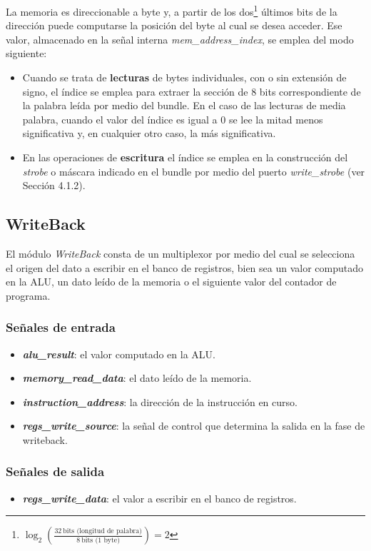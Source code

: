 La memoria es direccionable a byte y, a partir de los dos\footnote{$\log_2\left(\frac{32\ \text{bits (longitud de palabra)}}{8\ \text{bits (1 byte)}}\right) = 2$} últimos bits de la dirección puede computarse la posición del byte al cual se desea acceder. Ese valor, almacenado en la señal interna \textit{mem\_address\_index}, se emplea del modo siguiente:

\begin{itemize}
  \item Cuando se trata de \textbf{lecturas} de bytes individuales, con o sin extensión de signo, el índice se emplea para extraer la sección de 8 bits correspondiente de la palabra leída por medio del bundle. En el caso de las lecturas de media palabra, cuando el valor del índice es igual a 0 se lee la mitad menos significativa y, en cualquier otro caso, la más significativa.
  \item En las operaciones de \textbf{escritura} el índice se emplea en la construcción del \textit{strobe} o máscara indicado en el bundle por medio del puerto \textit{write\_strobe} (ver Sección 4.1.2).
\end{itemize}

\subsection{WriteBack}

El módulo \textit{WriteBack} consta de un multiplexor por medio del cual se selecciona el origen del dato a escribir en el banco de registros, bien sea un valor computado en la ALU, un dato leído de la memoria o el siguiente valor del contador de programa.

\subsubsection{Señales de entrada}

\begin{itemize}
  \item \textbf{\textit{alu\_result}}: el valor computado en la ALU.
  \item \textbf{\textit{memory\_read\_data}}: el dato leído de la memoria.
  \item \textbf{\textit{instruction\_address}}: la dirección de la instrucción en curso.
  \item \textbf{\textit{regs\_write\_source}}: la señal de control que determina la salida en la fase de writeback.
\end{itemize}

\subsubsection{Señales de salida}

\begin{itemize}
  \item \textbf{\textit{regs\_write\_data}}: el valor a escribir en el banco de registros.
\end{itemize}